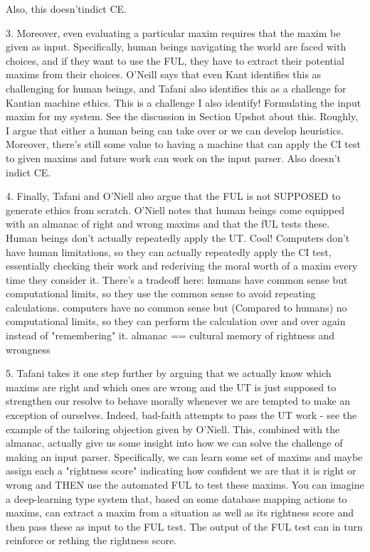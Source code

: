       Also, this doesn'tindict CE. 

3. Moreover, even evaluating a particular maxim requires that the maxim be given as input. Specifically,
human beings navigating the world are faced with choices, and if they want to use the FUL, they have to
extract their potential maxims from their choices. O'Neill says 
that even Kant identifies this as challenging for human beings, and Tafani also identifies this as a 
challenge for Kantian machine ethics.
      This is a challenge I also identify! Formulating the input maxim for my system. See the discussion 
      in Section Upshot about this. Roughly, I argue that either a human being can take over or we can 
      develop heuristics. Moreover, there's still some value to having a machine that can apply the CI
      test to given maxims and future work can work on the input parser. Also doesn't indict CE.

4. Finally, Tafani and O'Niell also argue that the FUL is not SUPPOSED to generate ethics from scratch.
O'Niell notes that human beings come equipped with an almanac of right and wrong maxims and that
the fUL tests these. Human beings don't actually repeatedly apply the UT.
      Cool! Computers don't have human limitations, so they can actually repeatedly apply the CI test, 
      essentially checking their work and rederiving the moral worth of a maxim every time they consider it.
      There's a tradeoff here: humans have common sense but computational limits, so they use the common 
      sense to avoid repeating calculations. computers have no common sense but (Compared to humans)
      no computational limits, so they can perform the calculation over and over again instead of
      "remembering" it. almanac == cultural memory of rightness and wrongness

5. Tafani takes it one step further by arguing that we actually know which maxims are right
and which ones are wrong and the UT is just supposed to strengthen our resolve to behave morally whenever
we are tempted to make an exception of ourselves. Indeed, bad-faith attempts to pass the UT work - see 
the example of the tailoring objection given by O'Niell. 
    This, combined with the almanac, actually give us some insight into how we can solve the challenge
    of making an input parser. Specifically, we can learn some set of maxims and maybe assign each a 
    "rightness score" indicating how confident we are that it is right or wrong and THEN use the automated
    FUL to test these maxims. You can imagine a deep-learning type system that, based on some database
    mapping actions to maxims, can extract a maxim from a situation as well as its rightness score
    and then pass these as input to the FUL test. The output of the FUL test can in turn reinforce or
    rething the rightness score.
                                          
